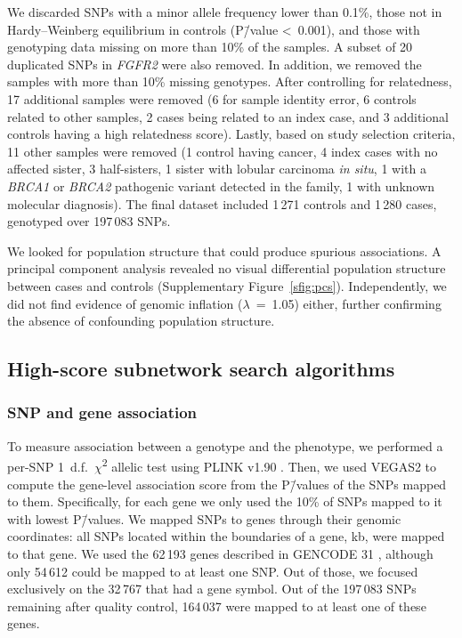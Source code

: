\documentclass[twocolumn, 11pt]{article}
\begin{document}
We discarded SNPs with a minor allele frequency lower than 0.1\%, those not in Hardy--Weinberg equilibrium in controls (P\=/value \textless~0.001), and those with genotyping data missing on more than 10\% of the samples. A subset of 20 duplicated SNPs in \emph{FGFR2} were also removed. In addition, we removed the samples with more than 10\% missing genotypes. After controlling for relatedness, 17 additional samples were removed (6 for sample identity error, 6 controls related to other samples, 2 cases being related to an index case, and 3 additional controls having a high relatedness score). Lastly, based on study selection criteria, 11 other samples were removed (1 control having cancer, 4 index cases with no affected sister, 3 half-sisters, 1 sister with lobular carcinoma \emph{in situ}, 1 with a \emph{BRCA1} or \emph{BRCA2} pathogenic variant detected in the family, 1 with unknown molecular diagnosis). The final dataset included 1\,271 controls and 1\,280 cases, genotyped over 197\,083 SNPs. 

We looked for population structure that could produce spurious associations. A principal component analysis revealed no visual differential population structure between cases and controls (Supplementary Figure~\ref{sfig:pcs}). Independently, we did not find evidence of genomic inflation (\(\lambda\)~=~1.05) either, further confirming the absence of confounding population structure.

\subsection{High-score subnetwork search algorithms}
\subsubsection{SNP and gene association}
\label{methods:node_score}
To measure association between a genotype and the phenotype, we performed a per-SNP 1~d.f.~\(\chi\)\textsuperscript{2} allelic test using PLINK v1.90 \cite{chang_second-generation_2015}. Then, we used VEGAS2 \cite{mishra_vegas2:_2015} to compute the gene-level association score from the P\=/values of the SNPs mapped to them. Specifically, for each gene we only used the 10\% of SNPs mapped to it with lowest P\=/values. We mapped SNPs to genes through their genomic coordinates: all SNPs located within the boundaries of a gene,  kb, were mapped to that gene. We used the 62\,193 genes described in GENCODE 31 \cite{frankish_gencode_2019}, although only 54\,612 could be mapped to at least one SNP. Out of those, we focused exclusively on the 32\,767 that had a gene symbol. Out of the 197\,083 SNPs remaining after quality control, 164\,037 were mapped to at least one of these genes. 
\end{document}

